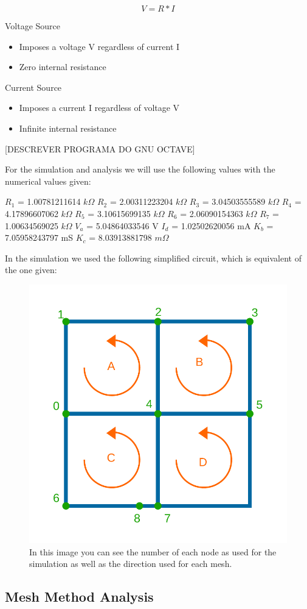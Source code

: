 \begin{equation}
	V = R * I
	\label{eq:kvl}
\end{equation}

Voltage Source

\begin{itemize}
	\item Imposes a voltage V regardless of current I
	\item Zero internal resistance
\end{itemize}

Current Source

\begin{itemize}
	\item Imposes a current I regardless of voltage V
	\item Infinite internal resistance
\end{itemize}

[DESCREVER PROGRAMA DO GNU OCTAVE]

For the simulation and analysis we will use the following values with the numerical values given:

$R_1$ = 1.00781211614 $k\Omega$
$R_2$ = 2.00311223204 $k\Omega$
$R_3$ = 3.04503555589 $k\Omega$
$R_4$ = 4.17896607062 $k\Omega$
$R_5$ = 3.10615699135 $k\Omega$
$R_6$ = 2.06090154363 $k\Omega$
$R_7$ = 1.00634569025 $k\Omega$
$V_a$ = 5.04864033546 V
$I_d$ = 1.02502620056 mA
$K_b$ = 7.05958243797 mS
$K_c$ = 8.03913881798 $m\Omega$

In the simulation we used the following simplified circuit, which is equivalent of the one given:

\begin{figure}[h] \centering
	\includegraphics[width=0.4\linewidth]{sim.pdf}
	\caption{In this image you can see the number of each node as used for the simulation as well as the direction used for each mesh.}
	\label{fig:sim}
\end{figure}

\subsection{Mesh Method Analysis}

